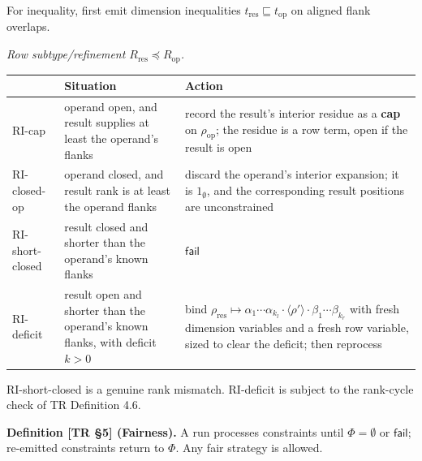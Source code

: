 \documentclass[
  10pt,
  letterpaper,
]{article}
\begin{document}
For inequality, first emit dimension inequalities
\(t_{\mathrm{res}} \sqsubseteq t_{\mathrm{op}}\) on aligned flank
overlaps.

\emph{Row subtype/refinement
\(R_{\mathrm{res}} \preceq R_{\mathrm{op}}\).}

\begin{longtable}[]{@{}
  >{\raggedright\arraybackslash}p{}
  >{\raggedright\arraybackslash}p{}
  >{\raggedright\arraybackslash}p{}@{}}
\toprule\noalign{}
\begin{minipage}[b]{\linewidth}\raggedright
\end{minipage} & \begin{minipage}[b]{\linewidth}\raggedright
Situation
\end{minipage} & \begin{minipage}[b]{\linewidth}\raggedright
Action
\end{minipage} \\
\midrule\noalign{}
\endhead
\bottomrule\noalign{}
\endlastfoot
RI-cap & operand open, and result supplies at least the operand's flanks
& record the result's interior residue as a \textbf{cap} on
\(\rho_{\mathrm{op}}\); the residue is a row term, open if the result is
open \\
RI-closed-op & operand closed, and result rank is at least the operand
flanks & discard the operand's interior expansion; it is
\(1_\emptyset\), and the corresponding result positions are
unconstrained \\
RI-short-closed & result closed and shorter than the operand's known
flanks & \(\mathsf{fail}\) \\
RI-deficit & result open and shorter than the operand's known flanks,
with deficit \(k > 0\) & bind
\(\rho_{\mathrm{res}} \mapsto \alpha_1 \cdots \alpha_{k_l} \cdot \langle\rho'\rangle \cdot \beta_1 \cdots \beta_{k_r}\)
with fresh dimension variables and a fresh row variable, sized to clear
the deficit; then reprocess \\
\end{longtable}

RI-short-closed is a genuine rank mismatch. RI-deficit is subject to the
rank-cycle check of TR Definition 4.6.

\textbf{Definition {[}TR §5{]} (Fairness).} A run processes constraints
until \(\Phi = \emptyset\) or \(\mathsf{fail}\); re-emitted constraints
return to \(\Phi\). Any fair strategy is allowed.
\end{document}

